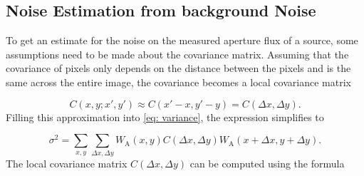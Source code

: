 




\subsection{Noise Estimation from background Noise}\label{subsec: Noise Estimation from background Noise}

To get an estimate for the noise on the measured aperture flux of a source, some assumptions need to be made about the covariance matrix. 
Assuming that the covariance of pixels only depends on the distance between the pixels and is the same across the entire image, the covariance becomes a local covariance matrix

\begin{equation}
    C(x,y;x',y') \approx C(x'-x,y'-y)=C(\Delta x, \Delta y).
\end{equation}
Filling this approximation into \autoref{eq: variance}, the expression simplifies to 

\begin{equation}\label{eq: local variance}
    \sigma^2 = \sum_{x,y}\sum_{\Delta x,\Delta y}W_\mathrm{A}(x,y)C(\Delta x, \Delta y)W_\mathrm{A}(x+\Delta x,y + \Delta y).
\end{equation}
The local covariance matrix $C(\Delta x, \Delta y)$ can be computed using the formula

